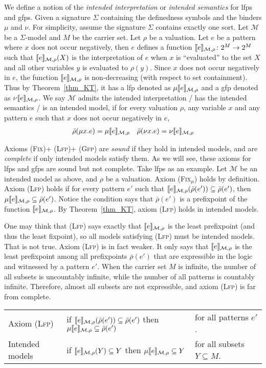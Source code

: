 \documentclass[acmsmall,review,anonymous]{acmart}
\newcommand{\sig}{\mathbb{\Sigma}}
\newcommand{\MM}{\mathcal{M}}
\newcommand{\pset}[1]{2^{#1}}
\newcommand{\barrho}{\bar{\rho}}
\newcommand{\prule}[1]{\textsc{(#1)}}
\newcommand{\Lfp}{\prule{Lfp}\xspace}
\newcommand{\Gfp}{\prule{Gfp}\xspace}
\newcommand{\Fix}{\prule{Fix}\xspace}
\newcommand{\Fixmu}{\prule{Fix$_\mu$}\xspace}
\DeclarePairedDelimiter{\bracket}{\llbracket}{\rrbracket}
\begin{document}
We define a notion of the \emph{intended interpretation}
or \emph{intended semantics} for lfps and gfps.
Given a signature $\sig$ containing the definedness symbols and the binders $\mu$ and $\nu$.
For simplicity, assume the signature $\sig$ contains exactly one sort.
Let $\MM$ be a $\sig$-model and $M$ be the carrier set.
Let $\rho$ be a valuation.
Let $e$ be a pattern where $x$ does not occur negatively,
then $e$ defines a function $\bracket{e}_{\MM,\rho} \colon \pset{M} \to \pset{M}$
such that $\bracket{e}_{\MM,\rho}(X)$ is the interpretation of $e$
when $x$ is ``evaluated'' to the set $X$ and all other variables $y$
is evaluated to $\rho(y)$.
Since $x$ does not occur negatively in $e$,
the function $\bracket{e}_{\MM,\rho}$ is non-decreasing (with respect to set containment).
Thus by Theorem~\ref{thm_KT},
it has a lfp denoted as $\mu \bracket{e}_{\MM,\rho}$
and a gfp denoted as $\nu \bracket{e}_{\MM,\rho}$.
We say $\MM$
admits the intended interpretation /
has the intended semantics /
is an intended model,
if for every valuation $\rho$, any variable $x$ and any pattern $e$
such that $x$ does not occur negatively in $e$,
\begin{align*}
\barrho(\mu x . e) = \mu \bracket{e}_{\MM,\rho}
&&
\barrho(\nu x . e) = \nu \bracket{e}_{\MM,\rho}
\end{align*}

Axioms \Fix + \Lfp + \Gfp are \emph{sound} if they hold in intended models,
and are \emph{complete} if only intended models satisfy them.
As we will see, these axioms for lfps and gfps are sound but not complete.
Take lfps as an example.
Let $\MM$ be an intended model as above, and $\rho$ be a valuation.
Axiom \Fixmu holds by definition.
Axiom \Lfp holds if for every pattern $e'$ such that
$\bracket{e}_{\MM,\rho}(\barrho(e')) \subseteq \barrho(e')$,
then
$\mu \bracket{e}_{\MM,\rho} \subseteq \barrho(e')$.
Notice the condition says that $\barrho(e')$ is a prefixpoint of the function
$\bracket{e}_{\MM,\rho}$.
By Theorem~\ref{thm_KT}, axiom \Lfp holds in intended models.

One may think that \Lfp says exactly that $\bracket{e}_{\MM,\rho}$
is the least prefixpoint (and thus the least fixpoint),
so all models satisfying \Lfp must be intended models.
That is not true.
Axiom \Lfp is in fact weaker.
It only says that $\bracket{e}_{\MM,\rho}$ is the least prefixpoint
among all prefixpoints $\barrho(e')$ that are
expressible in the logic and witnessed by a pattern $e'$.
When the carrier set $M$ is infinite, the number of all subsets is uncountably infinite,
while the number of all patterns is countably infinite.
Therefore, almost all subsets are not expressible, and axiom \Lfp
is far from complete.
\begin{center}
\begin{tabular}{lll}
Axiom \Lfp
&
if $\bracket{e}_{\MM,\rho}(\barrho(e')) \subseteq \barrho(e')$
then $\mu \bracket{e}_{\MM,\rho}\subseteq \barrho(e')$
&
for all patterns $e'$.
\\
Intended models
&
if $\bracket{e}_{\MM,\rho}(Y) \subseteq Y$
then $\mu \bracket{e}_{\MM,\rho}\subseteq Y$
&
for all subsets $Y \subseteq M$.
\end{tabular}
\end{center}
\end{document}
